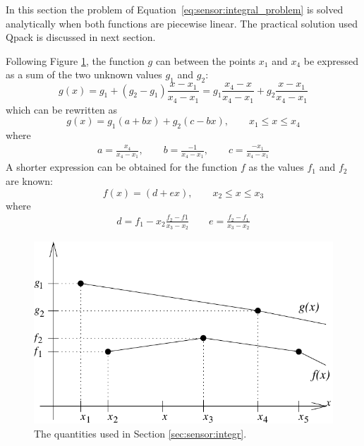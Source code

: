  \label{sec:sensor:integr:lins}
 
 In this section the problem of
 Equation~\ref{eq:sensor:integral_problem} is solved analytically when
 both functions are piecewise linear. The practical solution used
 Qpack is discussed in next section.
  
 Following Figure \ref{fig:sensor:vecintegr}, the function $g$ can between
 the points $x_1$ and $x_4$ be expressed as a sum of the two unknown
 values $g_1$ and $g_2$:
 \begin{equation}
   g(x) = g_1 + (g_2-g_1)\frac{x-x_1}{x_4-x_1} =
           g_1 \frac{x_4-x}{x_4-x_1} + g_2\frac{x-x_1}{x_4-x_1}
 \end{equation}
 which can be rewritten as
 \begin{equation}
   g(x) = g_1(a+bx)+g_2(c-bx), \qquad x_1 \leq x \leq x_4
   \label{eq:sensor:glin}
 \end{equation}
 where
 \begin{eqnarray}
    a=\frac{x_4}{x_4-x_1}, \qquad b=\frac{-1}{x_4-x_1}, \qquad 
    c=\frac{-x_1}{x_4-x_1}   \nonumber
 \end{eqnarray} 
 A shorter expression can be obtained for the function $f$ as the
 values $f_1$ and $f_2$ are known:
 \begin{equation}
   f(x) = (d+ex), \qquad x_2 \leq x \leq x_3
 \end{equation}
 where 
 \begin{eqnarray}
    d=f_1-x_2\frac{f_2-f1}{x_3-x_2} \qquad e=\frac{f_2-f_1}{x_3-x_2} \nonumber
 \end{eqnarray}
 \begin{figure}[tb]
    \begin{center}
      \includegraphics*{Figs/vecintegr}
      \caption{The quantities used in Section \ref{sec:sensor:integr}.}  
      \label{fig:sensor:vecintegr} 
    \end{center} 
 \end{figure}
